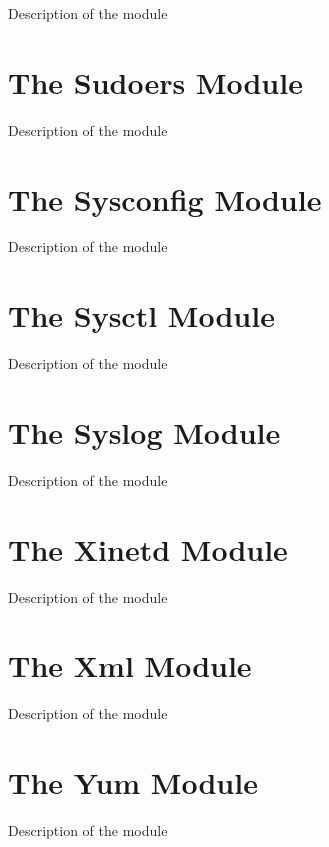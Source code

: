 Description of the module

\section{The Sudoers Module}

Description of the module

\section{The Sysconfig Module}

Description of the module

\section{The Sysctl Module}

Description of the module

\section{The Syslog Module}

Description of the module

\section{The Xinetd Module}

Description of the module

\section{The Xml Module}

Description of the module

\section{The Yum Module}

Description of the module


